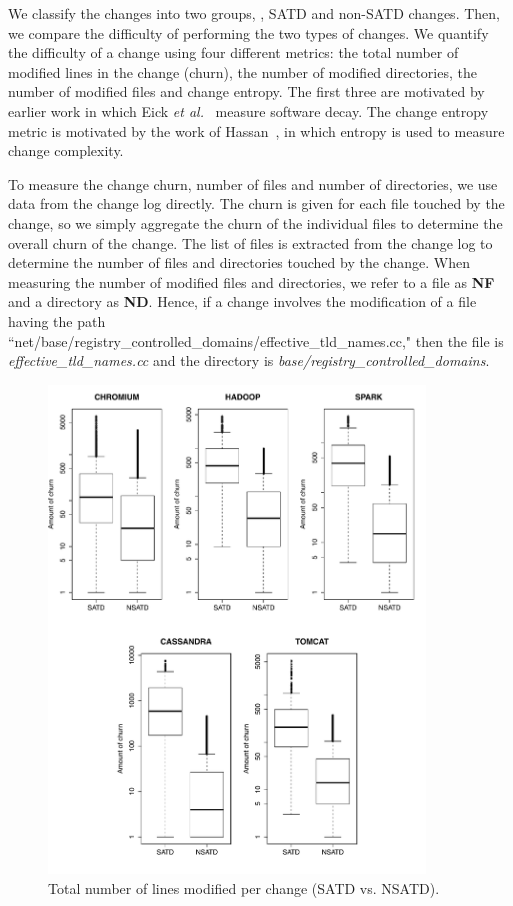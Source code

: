   We classify the changes into two groups, \ie{}, SATD and non-SATD changes. Then, we compare the difficulty of performing the two types of changes. We quantify the difficulty of a change using four different metrics: the total number of modified lines in the change (churn), the number of modified directories, the number of modified files and change entropy. The first three are motivated by earlier work in which Eick \emph{et al.}~\cite{eick2001decay} measure software decay. The change entropy metric is motivated by the work of Hassan~\cite{hassan2009predicting}, in which entropy is used to measure change complexity.



To measure the change churn, number of files and number of directories, we use data from the change log directly. The churn is given for each file touched by the change, so we simply aggregate the churn of the individual files to determine the overall churn of the change. The list of files is extracted from the change log to determine the number of files and directories touched by the change. When measuring the number of modified  files and directories, we refer to a file as \textbf{NF} and  a directory as \textbf{ND}. Hence, if a change involves the modification of a file having the path ``net/base/registry\_controlled\_domains/effective\_tld\_names.cc," then the file is \textit{effective\_tld\_names.cc} and the directory is \textit{base/registry\_controlled\_domains}.



\begin{figure}[!hp]
	\centering
	\includegraphics[width=100mm]{figures/chapter3/churn_for_all_projects}
	\caption{Total number of lines modified per change (SATD vs. NSATD).}
	\label{figure:tlcpc}
\end{figure}




